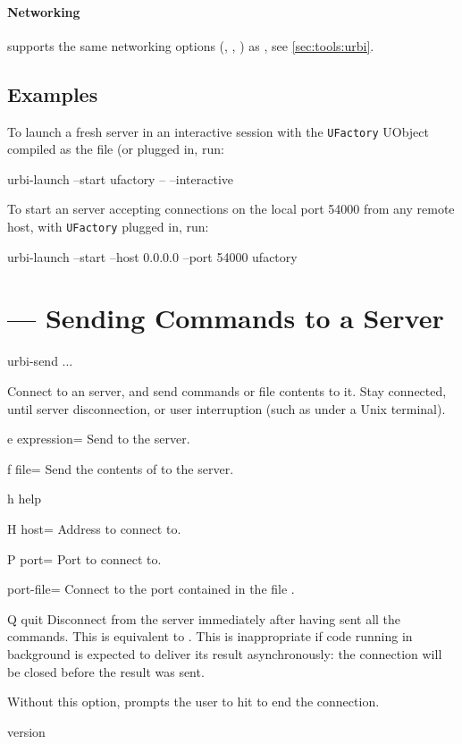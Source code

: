 \paragraph{Networking}
 supports the same networking options
(, , ) as
, see \autoref{sec:tools:urbi}.

\subsection{Examples}

To launch a fresh server in an interactive session with the
\lstinline|UFactory| UObject compiled as the file 
(or  plugged in, run:

\begin{shell}
urbi-launch --start ufactory -- --interactive
\end{shell}

To start an \urbi server accepting connections on the local port 54000
from any remote host, with \lstinline|UFactory| plugged in, run:

\begin{shell}
urbi-launch --start --host 0.0.0.0 --port 54000 ufactory
\end{shell}


\section{ --- Sending \us Commands to a Server}
\label{sec:tools:urbi-send}

\begin{shell}
urbi-send ...
\end{shell}

Connect to an \urbi server, and send commands or file contents to it.
Stay connected, until server disconnection, or user interruption (such
as  under a Unix terminal).

\begin{options}
\item[e]{expression=} Send  to the server.
\item[f]{file=} Send the contents of  to the
  server.
\item[h]{help} \optionHelp
\item[H]{host=} Address to connect to.
\item[P]{port=} Port to connect to.
\item{port-file=} Connect to the port contained in the file
  .
\item[Q]{quit} Disconnect from the server immediately after having
  sent all the commands.  This is equivalent to .
  This is inappropriate if code running in background is expected to
  deliver its result asynchronously: the connection will be closed
  before the result was sent.

  Without this option,  prompts the user to hit
   to end the connection.
\item{version} \optionVersion
\end{options}


